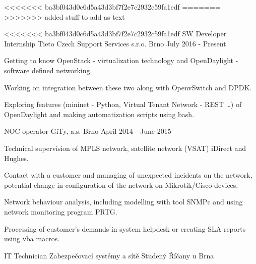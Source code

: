 <<<<<<< ba3bf043d0c6d5a43d3bf7f2e7c2932c59fa1edf
=======
\vspace{2pt}
>>>>>>> added stuff to add as text


\begin{cventries}

  \cventry
<<<<<<< ba3bf043d0c6d5a43d3bf7f2e7c2932c59fa1edf
    {SW Developer Internship}
    {Tieto Czech Support Services s.r.o.}
    {Brno}
    {July 2016 - Present}
    {
      \begin{cvitems}
       \item {Getting to know OpenStack - virtualization technology and OpenDaylight - software defined networking.}
       \item {Working on integration between these two along with OpenvSwitch and DPDK.}
       \item {Exploring features (mininet - Python, Virtual Tenant Network - REST \dots) of OpenDaylight and making automatization scripts using bash.}
      \end{cvitems}
    }
  \cventry
    {NOC operator} %
    {GiTy, a.s.} %
    {Brno} %
    {April 2014 - June 2015} %
    {
      \begin{cvitems} %
	\item {Technical supervision of MPLS network, satellite network (VSAT) iDirect and Hughes.}
        \item {Contact with a customer and managing of unexpected incidents on the network, potential change in configuration of the network on Mikrotik/Cisco devices.}     
        \item {Network behaviour analysis, including modelling with tool SNMPc and using network monitoring program PRTG.}     
        \item {Processing of customer's demands in system helpdesk or creating SLA reports using vba macros.}        
      \end{cvitems}
    }
   \cventry
   {IT Technician}
   {Zabezpečovací systémy a sítě Studený}
   {Říčany u Brna}

\end{cventries}
